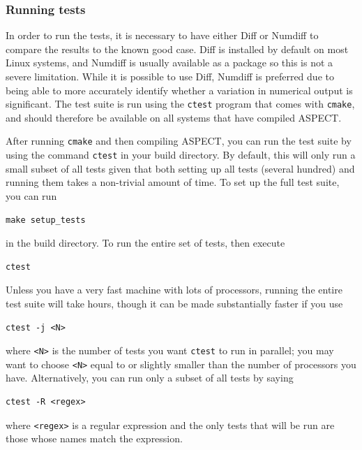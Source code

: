 \documentclass{article}
\newcommand{\aspect}{\textsc{ASPECT}}
\begin{document}
\subsubsection{Running tests}
\label{sec:running_tests}

In order to run the tests, it is necessary to have either Diff or Numdiff to
compare the results to the known good case.
Diff is installed by default on most Linux systems, and Numdiff is usually
available as a package so this is not a severe limitation.
While it is possible to use Diff, Numdiff is preferred due to being able to
more accurately identify whether a variation in numerical output is
significant.
The test suite is run using the \texttt{ctest} program that comes with
\texttt{cmake}, and should therefore be available on all systems that have
compiled \aspect{}.

After running \texttt{cmake} and then compiling \aspect{}, you can run the
test suite by using the command \texttt{ctest} in your build directory. By default, this will only run a small
subset of all tests given that both setting up all tests (several hundred) and
running them takes a non-trivial amount of time. To set up the full test suite,
you can run
\begin{lstlisting}[frame=single,language=ksh]
    make setup_tests
\end{lstlisting}
 in the build directory. To run the entire set of tests, then execute
\begin{lstlisting}[frame=single,language=ksh]
    ctest
\end{lstlisting}
Unless you have a very fast machine with lots of processors, running the entire
test suite will take hours, though it can be made substantially faster if you use
\begin{lstlisting}[frame=single,language=ksh]
    ctest -j <N>
\end{lstlisting}
where \texttt{<N>} is the number of tests you want \texttt{ctest} to run
in parallel; you may want to choose \texttt{<N>} equal to or slightly smaller
than the number of processors you have. Alternatively, you can run only a subset
of all tests by saying
\begin{lstlisting}[frame=single,language=ksh]
    ctest -R <regex>
\end{lstlisting}
where \texttt{<regex>} is a regular expression and the only tests that will be
run are those whose names match the expression.
\end{document}
